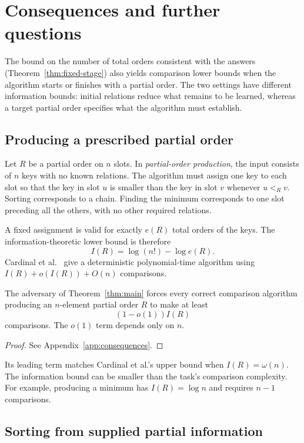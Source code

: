 \section{Consequences and further questions}\label{sec:consequences}

The bound on the number of total orders consistent with the answers
(Theorem~\ref{thm:fixed-stage}) also yields comparison lower bounds when
the algorithm starts or finishes with a partial order.
The two settings have different information bounds:
initial relations reduce what remains to be learned, whereas a target
partial order specifies what the algorithm must establish.

\subsection{Producing a prescribed partial order}

Let $R$ be a partial order on $n$ slots. In \emph{partial-order production},
the input consists of $n$ keys with no known relations. The algorithm must
assign one key to each slot so that the key in slot $u$ is smaller than
the key in slot $v$ whenever $u<_R v$. Sorting corresponds to a chain.
Finding the minimum corresponds to one slot preceding all the others,
with no other required relations.

A fixed assignment is valid for exactly $e(R)$ total orders of the keys.
The information-theoretic lower bound is therefore
\[
I(R)=\log(n!)-\log e(R).
\]
Cardinal et al.~\cite{cardinal-production} give a deterministic
polynomial-time algorithm using $I(R)+o(I(R))+O(n)$ comparisons.

\begin{corollary}\label{cor:production}
The adversary of Theorem~\ref{thm:main} forces every
correct comparison algorithm producing an $n$-element partial order $R$
to make at least
\[
(1-o(1))I(R)
\]
comparisons. The $o(1)$ term depends only on $n$.
\end{corollary}
\begin{proof}
See Appendix~\ref{app:consequences}.
\end{proof}

Its leading term matches Cardinal et al.'s upper bound when
$I(R)=\omega(n)$. The information bound can be smaller than the task's
comparison complexity. For example, producing a minimum has
$I(R)=\log n$ and requires $n-1$ comparisons.

\subsection{Sorting from supplied partial information}

